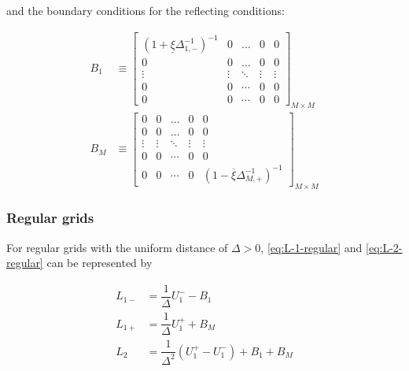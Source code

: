 \documentclass[11pt]{article}
\theoremstyle{definition}
\begin{document}
and the boundary conditions for the reflecting conditions:

\begin{align}
B_{1}  &\equiv \begin{bmatrix}
(1 + \underline{\xi} \Delta^{-1}_{1,-})^{-1} &0&\dots&0&0\\
0&0&\dots&0&0\\
\vdots&\vdots&\ddots&\vdots&\vdots\\
0&0&\cdots&0&0\\
0&0&\cdots&0&0
\end{bmatrix}_{M\times M} \\
B_{M}  &\equiv \begin{bmatrix}
0 &0&\dots&0&0\\
0&0&\dots&0&0\\
\vdots&\vdots&\ddots&\vdots&\vdots\\
0&0&\cdots&0&0\\
0&0&\cdots&0&(1 - \overline{\xi} \Delta^{-1}_{M,+})^{-1}
\end{bmatrix}_{M\times M}
\end{align}

\subsubsection{Regular grids}
For regular grids with the uniform distance of $\Delta > 0$, \eqref{eq:L-1-regular} and \eqref{eq:L-2-regular} can be represented by

\begin{align}
L_{1-} &= \dfrac{1}{\Delta} U_1^{-} - B_1 \\
L_{1+} &= \dfrac{1}{\Delta} U_1^{+} + B_{M} \\
L_2 &= \dfrac{1}{\Delta^2} (U_1^+ - U_1^-) + B_1 + B_{M}
\end{align}
\end{document}
